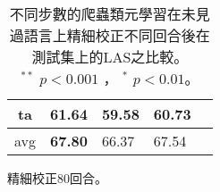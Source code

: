 \begin{table}[htbp]
\begin{subtable}[h]{0.8\textwidth}
\begin{tabular}[!ht]{c|llll}
                ta & \textbf{61.64} & 59.58 & 60.73 \\
                \hline
                avg & \textbf{67.80} & 66.37 & 67.54 \\
                \hline
            \end{tabular}
            \caption{精細校正80回合。}
        \end{subtable}
    \label{tab:delex_las_epoch_1}
    \caption{不同步數的爬蟲類元學習在未見過語言上精細校正不同回合後在測試集上的LAS之比較。\\
    ${ }^{**}$ $p < 0.001$ ， ${ }^{*}$ $p < 0.01$。}
\end{table}